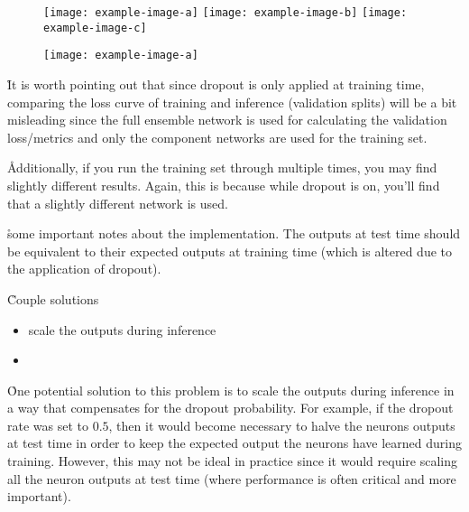 


\begin{figure}[htp]
	\centering
	\texttt{[image: example-image-a]}\hfil
	\texttt{[image: example-image-b]}\hfil
	\texttt{[image: example-image-c]}\hfil
	\caption{}
	\label{fig:regularization_dropout_overview_training}
\end{figure}

\begin{figure}[htp]
	\centering
	\texttt{[image: example-image-a]}\hfil
	\caption{}
	\label{fig:regularization_dropout_overview_test}
\end{figure}

\r{It is worth pointing out that since dropout is only applied at training time, comparing the loss curve of training and inference (validation splits) will be a bit misleading since the full ensemble network is used for calculating the validation loss/metrics and only the component  networks are used for the training set.}

\r{Additionally, if you run the training set through multiple times, you may find slightly different results. Again, this is because while dropout is on, you'll find that a slightly different network is used. }

\r{some important notes about the implementation. The outputs at test time should be equivalent to their expected outputs at training time (which is altered due to the application of dropout).}

\r{Couple solutions}
\begin{itemize}[noitemsep,topsep=0pt]
	\item scale the outputs during inference
	\item
\end{itemize}

\r{One potential solution to this problem is to scale the outputs during inference in a way that compensates for the dropout probability.  For example, if the dropout rate was set to $0.5$, then it would become necessary to halve the neurons outputs at test time in order to keep the expected output the neurons have learned during training.  However, this may not be ideal in practice since it would require scaling all the neuron outputs at test time (where performance is often critical and more important).}


